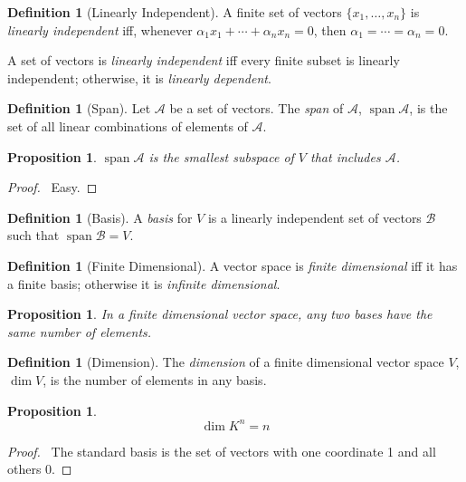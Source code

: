 \documentclass{book}
\let\qed\relax
\newtheorem{prop}[ax]{Proposition}
\theoremstyle{definition}
\newtheorem{df}[ax]{Definition}
\newcommand{\spn}{\ensuremath{\operatorname{span}}}
\begin{document}
\begin{df}[Linearly Independent]
A finite set of vectors $\{x_1, \ldots, x_n\}$ is \emph{linearly independent} iff, whenever $\alpha_1 x_1 + \cdots + \alpha_n x_n = 0$, then $\alpha_1 = \cdots = \alpha_n = 0$.

A set of vectors is \emph{linearly independent} iff every finite subset is linearly independent; otherwise, it is \emph{linearly dependent}.
\end{df}

\begin{df}[Span]
Let $\mathcal{A}$ be a set of vectors. The \emph{span} of $\mathcal{A}$, $\spn \mathcal{A}$, is the set of all linear combinations of elements of $\mathcal{A}$.
\end{df}

\begin{prop}
$\spn \mathcal{A}$ is the smallest subspace of $V$ that includes $\mathcal{A}$.
\end{prop}

\begin{proof}
\pf\ Easy. \qed
\end{proof}

\begin{df}[Basis]
A \emph{basis} for $V$ is a linearly independent set of vectors $\mathcal{B}$ such that $\spn \mathcal{B} = V$.
\end{df}

\begin{df}[Finite Dimensional]
A vector space is \emph{finite dimensional} iff it has a finite basis; otherwise it is \emph{infinite dimensional}.
\end{df}

\begin{prop}
In a finite dimensional vector space, any two bases have the same number of elements.
\end{prop}


\begin{df}[Dimension]
The \emph{dimension} of a finite dimensional vector space $V$, $\dim V$, is the number of elements in any basis.
\end{df}

\begin{prop}
\[ \dim K^n = n \]
\end{prop}

\begin{proof}
\pf\ The standard basis is the set of vectors with one coordinate 1 and all others 0. \qed
\end{proof}
\end{document}

